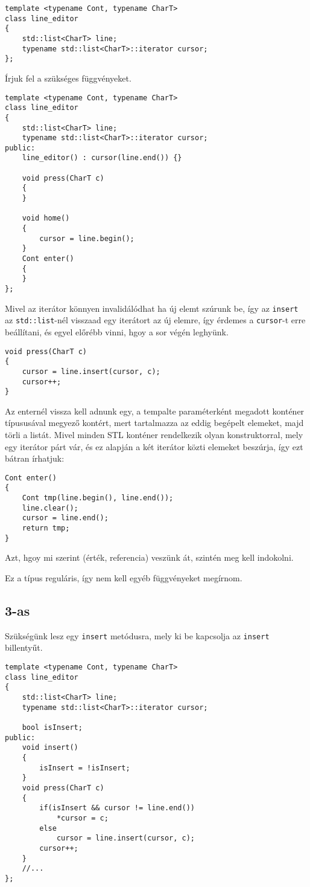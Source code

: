 \documentclass[a4paper,11.5pt,table]{article}
\begin{document}
\begin{lstlisting}
template <typename Cont, typename CharT>
class line_editor
{
	std::list<CharT> line;
	typename std::list<CharT>::iterator cursor;
};
\end{lstlisting}

	Írjuk fel a szükséges függvényeket.
	
\begin{lstlisting}
template <typename Cont, typename CharT>
class line_editor
{
	std::list<CharT> line;
	typename std::list<CharT>::iterator cursor;
public:
	line_editor() : cursor(line.end()) {}
	
	void press(CharT c)
	{
	}
	
	void home()
	{
		cursor = line.begin();
	}
	Cont enter()
	{
	}
};
\end{lstlisting}
	Mivel az iterátor könnyen invalidálódhat ha új elemt szúrunk be, így az \texttt{insert} az \texttt{std::list}-nél visszaad egy iterátort az új elemre, így érdemes a \texttt{cursor}-t erre beállítani, és egyel előrébb vinni, hgoy a sor végén leghyünk.
	\begin{lstlisting}
void press(CharT c)
{
	cursor = line.insert(cursor, c);
	cursor++;
}
	\end{lstlisting}
	Az enternél vissza kell adnunk egy, a tempalte paraméterként megadott konténer típususával megyező kontért, mert tartalmazza az eddig begépelt elemeket, majd törli a listát. Mivel minden STL konténer rendelkezik olyan konstruktorral, mely egy iterátor párt vár, és ez alapján a két iterátor közti elemeket beszúrja, így ezt bátran írhatjuk:
	\begin{lstlisting}
Cont enter()
{
	Cont tmp(line.begin(), line.end());
	line.clear();
	cursor = line.end();
	return tmp;
}
	\end{lstlisting}

	Azt, hgoy mi szerint (érték, referencia) veszünk át, szintén meg kell indokolni.
	
	Ez a típus reguláris, így nem kell egyéb függvényeket megírnom.
	
	\subsection{3-as}
	Szükségünk lesz egy \texttt{insert} metódusra, mely ki be kapcsolja az \texttt{insert} billentyűt.
\begin{lstlisting}
template <typename Cont, typename CharT>
class line_editor
{
	std::list<CharT> line;
	typename std::list<CharT>::iterator cursor;
	
	bool isInsert;
public:
	void insert()
	{
		isInsert = !isInsert;
	}
	void press(CharT c)
	{
		if(isInsert && cursor != line.end())
			*cursor = c;
		else
			cursor = line.insert(cursor, c);
		cursor++;
	}
	//...
};
\end{lstlisting}
\end{document}
